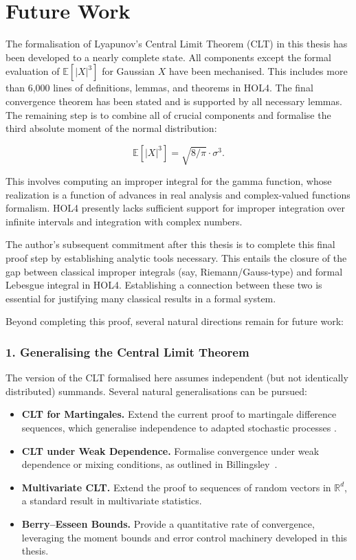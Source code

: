 \chapter{Future Work}
\label{future}

The formalisation of Lyapunov’s Central Limit Theorem (CLT) in this thesis has been developed to a nearly complete state. All components except the formal evaluation of $\mathbb{E}[|X|^3]$ for Gaussian $X$ have been mechanised. This includes more than 6,000 lines of definitions, lemmas, and theorems in HOL4. The final convergence theorem has been stated and is supported by all necessary lemmas. The remaining step is to combine all of crucial components and formalise the third absolute moment of the normal distribution:

\[
\mathbb{E}[|X|^3] = \sqrt{8/\pi} \cdot \sigma^3.
\]

This involves computing an improper integral for the gamma function, whose realization is a function of advances in real analysis and complex-valued functions formalism. HOL4 presently lacks sufficient support for improper integration over infinite intervals and integration with complex numbers.

The author's subsequent commitment after this thesis is to complete this final proof step by establishing analytic tools necessary. This entails the closure of the gap between classical improper integrals (say, Riemann/Gauss-type) and formal Lebesgue integral in HOL4. Establishing a connection between these two is essential for justifying many classical results in a formal system.

Beyond completing this proof, several natural directions remain for future work:

\subsection*{1. Generalising the Central Limit Theorem}

The version of the CLT formalised here assumes independent (but not identically distributed) summands. Several natural generalisations can be pursued:
\begin{itemize}
  \item \textbf{CLT for Martingales.} Extend the current proof to martingale difference sequences, which generalise independence to adapted stochastic processes \cite{hall2014martingale}.
  \item \textbf{CLT under Weak Dependence.} Formalise convergence under weak dependence or mixing conditions, as outlined in Billingsley~\cite{billingsley2017probability}.
  \item \textbf{Multivariate CLT.} Extend the proof to sequences of random vectors in \( \mathbb{R}^d \), a standard result in multivariate statistics.
  \item \textbf{Berry–Esseen Bounds.} Provide a quantitative rate of convergence, leveraging the moment bounds and error control machinery developed in this thesis. \cite{berry1941accuracy}
\end{itemize}

